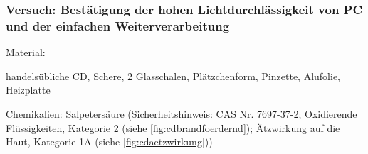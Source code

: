 \subsubsection{Versuch: Bestätigung der hohen Lichtdurchlässigkeit von PC und der einfachen Weiterverarbeitung}

Material:
\begin{itemize*}
    \item handelsübliche CD, Schere, 2 Glasschalen, Plätzchenform, Pinzette, Alufolie, Heizplatte
    \item Chemikalien: Salpetersäure (Sicherheitshinweis: CAS Nr. 7697-37-2; Oxidierende Flüssigkeiten, Kategorie 2 (siehe \autoref{fig:cdbrandfoerdernd}); Ätzwirkung auf die Haut, Kategorie 1A (siehe \autoref{fig:cdaetzwirkung}))
\end{itemize*}

